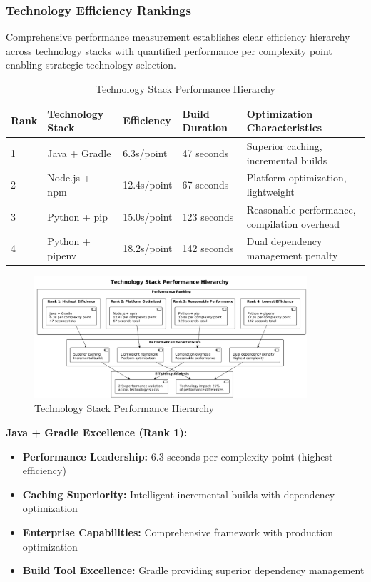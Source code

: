 \subsubsection{Technology Efficiency Rankings}

Comprehensive performance measurement establishes clear efficiency hierarchy across technology stacks with quantified performance per complexity point enabling strategic technology selection.

\begin{table}[H]
\centering
\caption{Technology Stack Performance Hierarchy}
\label{tab:technology_hierarchy}
\begin{tabular}{|p{1cm}|p{3cm}|p{2.5cm}|p{3cm}|p{4cm}|}
\hline
\textbf{Rank} & \textbf{Technology Stack} & \textbf{Efficiency} & \textbf{Build Duration} & \textbf{Optimization Characteristics} \\
\hline
1 & Java + Gradle & 6.3s/point & 47 seconds & Superior caching, incremental builds \\
\hline
2 & Node.js + npm & 12.4s/point & 67 seconds & Platform optimization, lightweight \\
\hline
3 & Python + pip & 15.0s/point & 123 seconds & Reasonable performance, compilation overhead \\
\hline
4 & Python + pipenv & 18.2s/point & 142 seconds & Dual dependency management penalty \\
\hline
\end{tabular}
\end{table}

\begin{figure}[H]
\centering
\includegraphics[width=0.9\textwidth]{figures/Technology-Stack-Performance-Hierarchy.png}
\caption{Technology Stack Performance Hierarchy}
\label{fig:technology-stack-hierarchy}
\end{figure}

\textbf{Java + Gradle Excellence (Rank 1):}
\begin{itemize}
\item \textbf{Performance Leadership:} 6.3 seconds per complexity point (highest efficiency)
\item \textbf{Caching Superiority:} Intelligent incremental builds with dependency optimization
\item \textbf{Enterprise Capabilities:} Comprehensive framework with production optimization
\item \textbf{Build Tool Excellence:} Gradle providing superior dependency management
\end{itemize}

